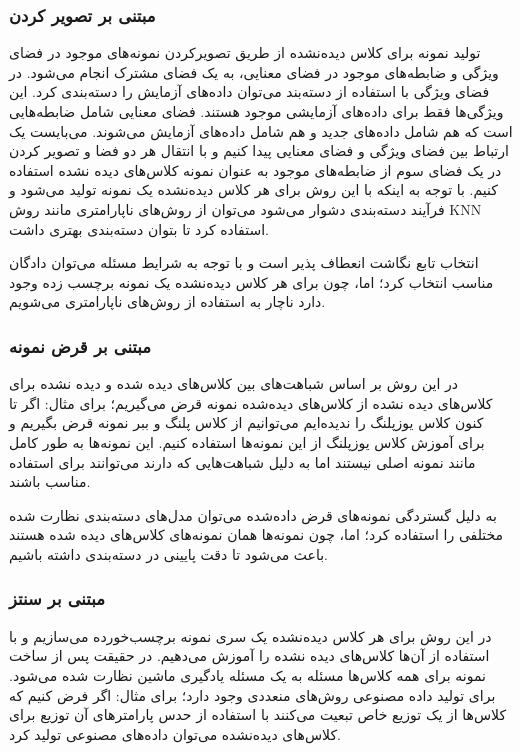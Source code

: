 \subsubsection{مبتنی بر تصویر کردن‌}
تولید نمونه برای کلاس دیده‌نشده از طریق تصویرکردن نمونه‌های موجود در فضای ویژگی و ضابطه‌های موجود در فضای معنایی، به یک فضای مشترک انجام می‌شود. در فضای ویژگی با استفاده از دسته‌بند می‌توان داده‌های آزمایش را دسته‌بندی کرد. این ویژگی‌ها فقط برای داده‌های آزمایشی موجود هستند. فضای معنایی شامل ضابطه‌هایی است که هم شامل داده‌های جدید و هم شامل داده‌های آزمایش می‌شوند. می‌بایست یک ارتباط بین فضای ویژگی و فضای معنایی پیدا کنیم و با انتقال هر دو فضا و تصویر کردن در یک فضای سوم از ضابطه‌های موجود به عنوان نمونه کلاس‌های دیده نشده استفاده کنیم. با توجه به اینکه با این روش برای هر کلاس دیده‌نشده یک نمونه تولید می‌شود و فرآیند دسته‌بندی دشوار می‌شود می‌توان از روش‌های ناپارامتری مانند روش KNN استفاده کرد تا بتوان دسته‌بندی بهتری داشت.

انتخاب تابع نگاشت انعطاف پذیر است و با توجه به شرایط مسئله می‌توان دادگان مناسب انتخاب کرد؛ اما، چون برای هر کلاس دیده‌نشده یک نمونه برچسب زده وجود دارد ناچار به استفاده از روش‌های ناپارامتری می‌شویم.

\subsubsection{مبتنی بر قرض نمونه‌}
در این روش بر اساس شباهت‌های بین کلاس‌های دیده شده و دیده نشده برای کلاس‌های دیده نشده از کلاس‌های دیده‌شده نمونه قرض می‌گیریم؛ برای مثال: اگر تا کنون کلاس یوزپلنگ را ندیده‌ایم می‌توانیم از کلاس پلنگ و ببر نمونه قرض بگیریم و برای آموزش کلاس یوزپلنگ از این نمونه‌ها استفاده کنیم. این نمونه‌ها به طور کامل مانند نمونه اصلی نیستند اما به دلیل شباهت‌هایی که دارند می‌توانند برای استفاده مناسب باشند.

به دلیل گستردگی نمونه‌های قرض داده‌شده می‌توان مدل‌های دسته‌بندی نظارت شده مختلفی را استفاده کرد؛ اما، چون نمونه‌ها همان نمونه‌های کلاس‌های دیده شده هستند باعث می‌شود تا دقت پایینی در دسته‌بندی داشته باشیم.

\subsubsection{مبتنی بر سنتز‌}
در این روش برای هر کلاس دیده‌نشده یک سری نمونه برچسب‌خورده می‌سازیم و با استفاده از آن‌ها کلاس‌های دیده نشده را آموزش می‌دهیم. در حقیقت پس از ساخت نمونه برای همه کلاس‌ها مسئله به یک مسئله یادگیری ماشین نظارت شده می‌شود. برای تولید داده مصنوعی روش‌های منعددی وجود دارد؛ برای مثال: اگر فرض کنیم که کلاس‌ها از یک توزیع خاص تبعیت می‌کنند با استفاده از حدس پارامتر‌های آن توزیع برای کلاس‌های دیده‌نشده می‌توان داده‌های مصنوعی تولید کرد.

